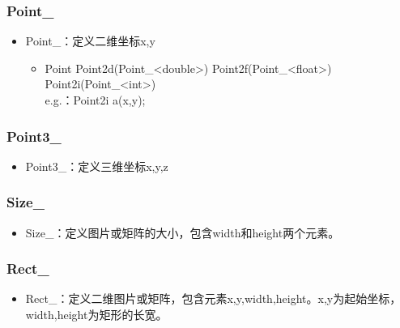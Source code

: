 \documentclass[12pt]{article}
\begin{document}
\subsubsection{Point\_}
\begin{itemize}
\item Point\_：定义二维坐标x,y
	\begin{itemize}
	\item Point \quad Point2d(Point\_<double>) \quad Point2f(Point\_<float>) \quad Point2i(Point\_<int>)\\
	e.g.：Point2i a(x,y);
	\end{itemize}
\end{itemize}
	
\subsubsection{Point3\_}
\begin{itemize}
\item Point3\_：定义三维坐标x,y,z
\end{itemize}

\subsubsection{Size\_}
\begin{itemize}
\item Size\_：定义图片或矩阵的大小，包含width和height两个元素。
\end{itemize}

\subsubsection{Rect\_}
\begin{itemize}
\item Rect\_：定义二维图片或矩阵，包含元素x,y,width,height。x,y为起始坐标，width,height为矩形的长宽。
\end{itemize}
\end{document}
